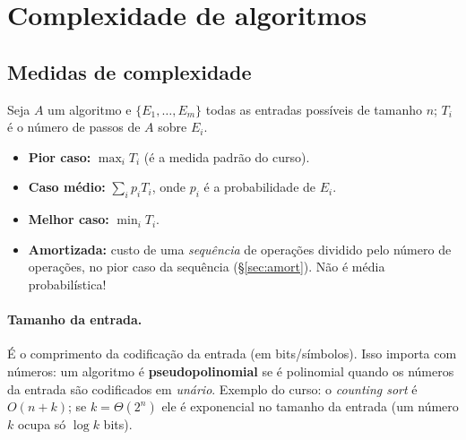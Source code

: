 \section{Complexidade de algoritmos}\label{sec:complex}

\subsection{Medidas de complexidade}
Seja $A$ um algoritmo e $\{E_1,\dots,E_m\}$ todas as entradas possíveis de tamanho $n$; $T_i$ é o número de passos de $A$ sobre $E_i$.
\begin{itemize}
  \item \textbf{Pior caso:} $\max_i T_i$ \quad(é a medida padrão do curso).
  \item \textbf{Caso médio:} $\sum_i p_i T_i$, onde $p_i$ é a probabilidade de $E_i$.
  \item \textbf{Melhor caso:} $\min_i T_i$.
  \item \textbf{Amortizada:} custo de uma \emph{sequência} de operações dividido pelo número de operações, no pior caso da sequência (§\ref{sec:amort}). Não é média probabilística!
\end{itemize}

\paragraph{Tamanho da entrada.} É o comprimento da codificação da entrada (em bits/símbolos). Isso importa com números: um algoritmo é \textbf{pseudopolinomial} se é polinomial quando os números da entrada são codificados em \emph{unário}. Exemplo do curso: o \emph{counting sort} é $O(n+k)$; se $k=\Theta(2^n)$ ele é exponencial no tamanho da entrada (um número $k$ ocupa só $\log k$ bits).


